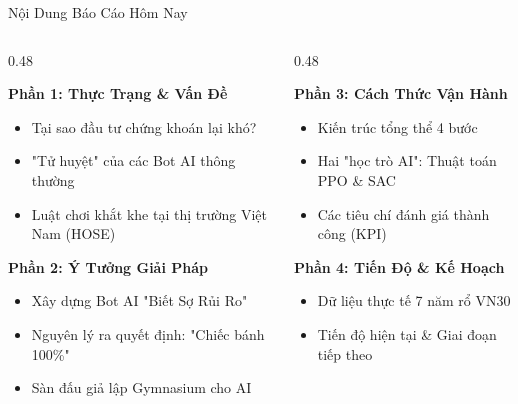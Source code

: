 \documentclass[aspectratio=169, 10pt]{beamer}
\begin{document}
\begin{frame}{Nội Dung Báo Cáo Hôm Nay}
  \begin{columns}[t]
    \begin{column}{0.48\textwidth}
      \begin{block}{\textbf{Phần 1: Thực Trạng \& Vấn Đề}}
        \begin{itemize}
          \item Tại sao đầu tư chứng khoán lại khó?
          \item "Tử huyệt" của các Bot AI thông thường
          \item Luật chơi khắt khe tại thị trường Việt Nam (HOSE)
        \end{itemize}
      \end{block}

      \vspace{0.8ex}
      \begin{block}{\textbf{Phần 2: Ý Tưởng Giải Pháp}}
        \begin{itemize}
          \item Xây dựng Bot AI "Biết Sợ Rủi Ro"
          \item Nguyên lý ra quyết định: "Chiếc bánh 100\%"
          \item Sàn đấu giả lập Gymnasium cho AI
        \end{itemize}
      \end{block}
    \end{column}

    \begin{column}{0.48\textwidth}
      \begin{block}{\textbf{Phần 3: Cách Thức Vận Hành}}
        \begin{itemize}
          \item Kiến trúc tổng thể 4 bước
          \item Hai "học trò AI": Thuật toán PPO \& SAC
          \item Các tiêu chí đánh giá thành công (KPI)
        \end{itemize}
      \end{block}

      \vspace{0.8ex}
      \begin{block}{\textbf{Phần 4: Tiến Độ \& Kế Hoạch}}
        \begin{itemize}
          \item Dữ liệu thực tế 7 năm rổ VN30
          \item Tiến độ hiện tại \& Giai đoạn tiếp theo
        \end{itemize}
      \end{block}
    \end{column}
  \end{columns}
\end{frame}
\end{document}
